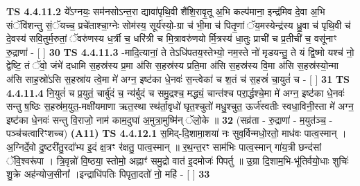 \documentclass[17pt]{extarticle}
\begin{document}
                  \newline
                                \textbf{ TS 4.4.11.2} \newline
                  ये᳚ऽग्नयः॒ सम॑नसोऽन्त॒रा द्यावा॑पृथि॒वी शै॑शि॒रावृ॒तू अ॒भि कल्प॑माना॒ इन्द्र॑मिव दे॒वा अ॒भि संॅवि॑शन्तु सं॒ॅयच्च॒ प्रचे॑ताश्चा॒ग्नेः सोम॑स्य॒ सूर्य॑स्यो॒-ग्रा च॑ भी॒मा च॑ पितृ॒णां ॅय॒मस्येन्द्र॑स्य ध्रु॒वा च॑ पृथि॒वी च॑ दे॒वस्य॑ सवि॒तुर्म॒रुतां॒ ॅवरु॑णस्य ध॒र्त्री च॒ धरि॑त्री च मि॒त्रावरु॑णयो र्मि॒त्रस्य॑ धा॒तुः प्राची॑ च प्र॒तीची॑ च॒ वसू॑नाꣳ रु॒द्राणा॑ - [  ] \textbf{  30} \newline
                  \newline
                                \textbf{ TS 4.4.11.3} \newline
                  -मादि॒त्यानां॒ ते तेऽधि॑पतय॒स्तेभ्यो॒ नम॒स्ते नो॑ मृडयन्तु॒ ते यं द्वि॒ष्मो यश्च॑ नो॒ द्वेष्टि॒ तं ॅवो॒ जंभे॑ दधामि स॒हस्र॑स्य प्र॒मा अ॑सि स॒हस्र॑स्य प्रति॒मा अ॑सि स॒हस्र॑स्य वि॒मा अ॑सि स॒हस्र॑स्यो॒न्मा अ॑सि साह॒स्रो॑ऽसि स॒हस्रा॑य त्वे॒मा मे॑ अग्न॒ इष्ट॑का धे॒नवः॑ स॒न्त्वेका॑ च श॒तं च॑ स॒हस्रं॑ चा॒युतं॑ च - [  ] \textbf{  31} \newline
                  \newline
                                \textbf{ TS 4.4.11.4} \newline
                  नि॒युतं॑ च प्र॒युतं॒ चार्बु॑दं च॒ न्य॑र्बुदं च समु॒द्रश्च॒ मद्ध्यं॒ चान्त॑श्च परा॒र्द्धश्चे॒मा मे॑ अग्न॒ इष्ट॑का धे॒नवः॑ सन्तु ष॒ष्ठिः स॒हस्र॑म॒युत॒-मक्षी॑यमाणा ऋत॒स्था स्थ॑र्ता॒वृधो॑ घृत॒श्चुतो॑ मधु॒श्चुत॒ ऊर्ज॑स्वतीः स्वधा॒विनी॒स्ता मे॑ अग्न॒ इष्ट॑का धे॒नवः॑ सन्तु वि॒राजो॒ नाम॑ काम॒दुघा॑ अ॒मुत्रा॒मुष्मि॑न् ॅलो॒के ॥ \textbf{  32} \newline
                  \newline
                      (सव्र॑ता - रु॒द्राणा॑ - म॒युत॑ञ्च॒ - पञ्च॑चत्वारिꣳशच्च)  \textbf{(A11)} \newline \newline
                                        \textbf{ TS 4.4.12.1} \newline
                  स॒मिद्-दि॒शामा॒शया॑ नः सुव॒र्विन्मधो॒रतो॒ माध॑वः पात्व॒स्मान् । अ॒ग्निर्दे॒वो दु॒ष्टरी॑तु॒रदा᳚भ्य इ॒दं क्ष॒त्रꣳ र॑क्षतु॒ पात्व॒स्मान् ॥ र॒थ॒न्त॒रꣳ साम॑भिः पात्व॒स्मान् गा॑य॒त्री छन्द॑सां ॅवि॒श्वरू॑पा । त्रि॒वृन्नो॑ वि॒ष्ठया॒ स्तोमो॒ अह्नाꣳ॑ समु॒द्रो वात॑ इ॒दमोजः॑ पिपर्तु ॥ उ॒ग्रा दि॒शाम॒भि-भू॑तिर्वयो॒धाः शुचिः॑ शु॒क्रे अह॑न्योज॒सीना᳚ ।इन्द्राधि॑पतिः पिपृता॒दतो॑ नो॒ महि॑ - [  ] \textbf{  33} \newline
                  \newline
\end{document}
